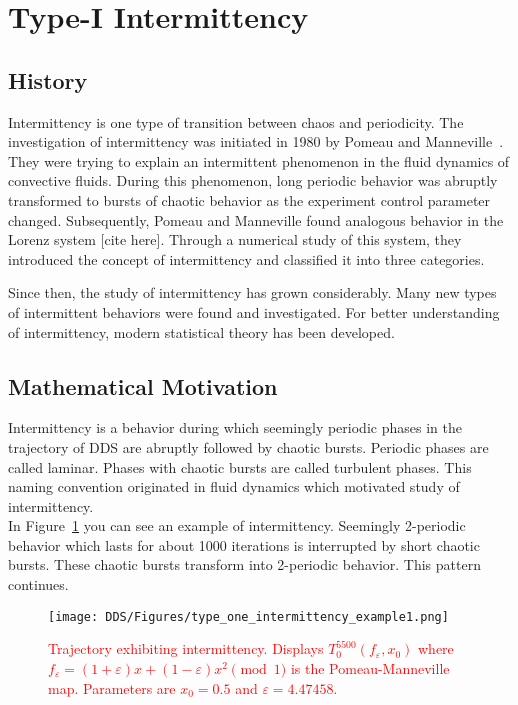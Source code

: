 \section{Type-I Intermittency}
\label{sec:type-I intermittency}

\subsection{History}
Intermittency is one type of transition between chaos and periodicity.
The investigation of intermittency was initiated in 1980 by Pomeau and Manneville~\cite{Pomeau1980}.
They were trying to explain an intermittent phenomenon in the fluid dynamics of convective fluids.
During this phenomenon, long periodic behavior was abruptly transformed to bursts of chaotic behavior as the experiment control parameter changed.
Subsequently, Pomeau and Manneville found analogous behavior in the Lorenz system [cite here].
Through a numerical study of this system, they introduced the concept of intermittency and classified it into three categories.~\cite{Pomeau1980}
\par
Since then, the study of intermittency has grown considerably.
Many new types of intermittent behaviors were found and investigated.
For better understanding of intermittency, modern statistical theory has been developed.
~\cite{Elaskar2017}

\subsection{Mathematical Motivation}
Intermittency is a behavior during which seemingly periodic phases in the trajectory of DDS are abruptly followed by chaotic bursts.
Periodic phases are called laminar.
Phases with chaotic bursts are called turbulent phases.
This naming convention originated in fluid dynamics which motivated study of intermittency.~\cite{Pomeau1980}
\\
In Figure~\ref{fig:intermittent_trajectory_example} you can see an example of intermittency.
Seemingly 2-periodic behavior which lasts for about 1000 iterations is interrupted by short chaotic bursts.
These chaotic bursts transform into 2-periodic behavior.
This pattern continues.

\begin{figure}[!h]
    \centering
    \texttt{[image: DDS/Figures/type\_one\_intermittency\_example1.png]}
    \caption{
        \textcolor{red}{
        Trajectory exhibiting intermittency. 
        Displays $T^{5500}_{0}(f_{\varepsilon}, x_0)$ where $f_{\varepsilon} = (1+\varepsilon)x+(1-\varepsilon)x^2 \pmod{1}$ is the Pomeau-Manneville map. 
        Parameters are $x_0 = 0.5$ and $\varepsilon = 4.47458$.
        }
    }
    \label{fig:intermittent_trajectory_example}
\end{figure}

